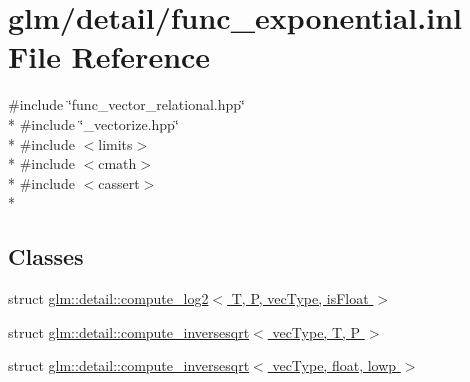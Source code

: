 \hypertarget{func__exponential_8inl}{\section{glm/detail/func\-\_\-exponential.inl File Reference}
\label{func__exponential_8inl}
}
{\ttfamily \#include \char`\"{}func\-\_\-vector\-\_\-relational.\-hpp\char`\"{}}\\*
{\ttfamily \#include \char`\"{}\-\_\-vectorize.\-hpp\char`\"{}}\\*
{\ttfamily \#include $<$limits$>$}\\*
{\ttfamily \#include $<$cmath$>$}\\*
{\ttfamily \#include $<$cassert$>$}\\*
\subsection*{Classes}
\begin{DoxyCompactItemize}
\item 
struct \hyperlink{structglm_1_1detail_1_1compute__log2}{glm\-::detail\-::compute\-\_\-log2$<$ T, P, vec\-Type, is\-Float $>$}
\item 
struct \hyperlink{structglm_1_1detail_1_1compute__inversesqrt}{glm\-::detail\-::compute\-\_\-inversesqrt$<$ vec\-Type, T, P $>$}
\item 
struct \hyperlink{structglm_1_1detail_1_1compute__inversesqrt_3_01vecType_00_01float_00_01lowp_01_4}{glm\-::detail\-::compute\-\_\-inversesqrt$<$ vec\-Type, float, lowp $>$}
\end{DoxyCompactItemize}
